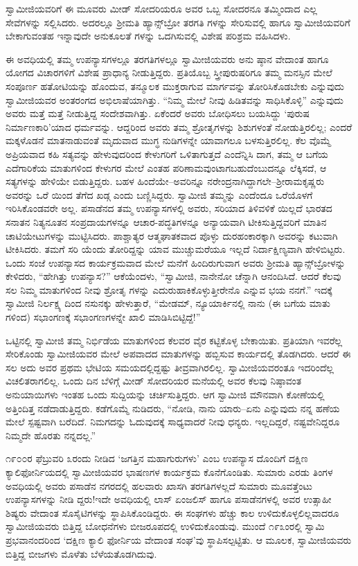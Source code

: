 ಸ್ವಾಮೀಜಿಯವರಿಗೆ ಈ ಮೂವರು ಮೀಡ್ ಸೋದರಿಯರೂ ಅವರ ಒಬ್ಬ ಸೋದರನೂ ತಮ್ಮಿಂದಾದ ಎಲ್ಲ ಸೇವೆಗಳನ್ನು ಸಲ್ಲಿಸಿದರು. ಅದರಲ್ಲೂ ಶ್ರೀಮತಿ ಹ್ಯಾನ್ಸ್​ಬ್ರೋ ತರಗತಿ ಗಳನ್ನು ಸೇರಿಸುವಲ್ಲಿ ಹಾಗೂ ಸ್ವಾಮೀಜಿಯವರಿಗೆ ಬೇಕಾಗುವಂತಹ ಇನ್ನಾವುದೇ ಅನುಕೂಲತೆ ಗಳನ್ನು ಒದಗಿಸುವಲ್ಲಿ ವಿಶೇಷ ಪರಿಶ್ರಮ ವಹಿಸಿದಳು.

ಈ ಅವಧಿಯಲ್ಲಿ ತಮ್ಮ ಉಪನ್ಯಾಸಗಳಲ್ಲೂ ತರಗತಿಗಳಲ್ಲೂ ಸ್ವಾಮೀಜಿಯವರು ಅನು ಷ್ಠಾನ ವೇದಾಂತ ಹಾಗೂ ಯೋಗದ ವಿಚಾರಗಳಿಗೆ ವಿಶೇಷ ಪ್ರಾಧಾನ್ಯ ನೀಡುತ್ತಿದ್ದರು. ಪ್ರತಿಯೊಬ್ಬ ಸ್ತ್ರೀಪುರುಷರಿಗೂ ತಮ್ಮ ಮನಸ್ಸಿನ ಮೇಲೆ ಸಂಪೂರ್ಣ ಹತೋಟಿಯನ್ನು ಹೊಂದುವ, ತನ್ಮೂಲಕ ಮುಕ್ತರಾಗುವ ಮಾರ್ಗವನ್ನು ತೋರಿಸಿಕೊಡಬೇಕು ಎನ್ನುವುದು ಸ್ವಾಮೀಜಿಯವರ ಅಂತರಂಗದ ಅಭಿಲಾಷೆಯಾಗಿತ್ತು. “ನಿಮ್ಮ ಮೇಲೆ ನೀವು ಹಿಡಿತವನ್ನು ಸಾಧಿಸಿಕೊಳ್ಳಿ” ಎನ್ನುವುದು ಅವರು ಮತ್ತೆ ಮತ್ತೆ ನೀಡುತ್ತಿದ್ದ ಸಂದೇಶವಾಗಿತ್ತು. ಏಕೆಂದರೆ ಅವರು ಬೋಧಿಸಲು ಬಯಸಿದ್ದು ‘ಪುರುಷ ನಿರ್ಮಾಣಕಾರಿ’ಯಾದ ಧರ್ಮವನ್ನು. ಆದ್ದರಿಂದ ಅವರು ತಮ್ಮ ಶ್ರೋತೃಗಳನ್ನು ಶಿಶುಗಳಂತೆ ನೋಡುತ್ತಿರಲಿಲ್ಲ; ಎಂದರೆ ಮಕ್ಕಳೊಡನೆ ಮಾತನಾಡುವಂತೆ ಮೃದುವಾದ ಮುಗ್ಧ ನುಡಿಗಳನ್ನೇ ಯಾವಾಗಲೂ ಬಳಸುತ್ತಿರಲಿಲ್ಲ. ಕೆಲ ವೊಮ್ಮೆ ಅಪ್ರಿಯವಾದ ಕಹಿ ಸತ್ಯವನ್ನು ಹೇಳುವುದರಿಂದ ಕೇಳುಗರಿಗೆ ಒಳಿತಾಗುತ್ತದೆ ಎಂದೆನ್ನಿಸಿ ದಾಗ, ತಮ್ಮ ಆ ಬಗೆಯ ಎದೆಗಾರಿಕೆಯ ಮಾತುಗಳಿಂದ ಕೇಳುಗರ ಮೇಲೆ ಎಂತಹ ಪರಿಣಾಮವುಂಟಾಗಬಹುದೆಂಬುದನ್ನೂ ಲೆಕ್ಕಿಸದೆ, ಆ ಸತ್ಯಗಳನ್ನು ಹೇಳಿಯೇ ಬಿಡುತ್ತಿದ್ದರು. ಬಹಳ ಹಿಂದೆಯೇ–ಅವರಿನ್ನೂ ನರೇಂದ್ರನಾಗಿದ್ದಾಗಲೇ–ಶ್ರೀರಾಮಕೃಷ್ಣರು ಅವರನ್ನು ಒರೆ ಯಿಂದ ತೆಗೆದ ಖಡ್ಗ ಎಂದು ಬಣ್ಣಿಸಿದ್ದರು. ಸ್ವಾಮೀಜಿ ತಮ್ಮನ್ನು ಎಂದೆಂದೂ ಒರೆಯೊಳಗೆ ಇರಿಸಿಕೊಂಡವರೇ ಅಲ್ಲ. ಪಸಾಡೆನದ ತಮ್ಮ ಉಪನ್ಯಾಸಗಳಲ್ಲಿ ಅವರು, ಸರಿಯಾದ ತಿಳಿವಳಿಕೆ ಯಿಲ್ಲದೆ ಭಾರತದ ಸನಾತನ ನಿತ್ಯನೂತನ ಸಂಪ್ರದಾಯಗಳನ್ನೂ ಆಚಾರ-ಪದ್ಧತಿಗಳನ್ನೂ ಅನ್ಯಾಯವಾಗಿ ಟೀಕಿಸುತ್ತಿದ್ದವರಿಗೆ ಮಾತಿನ ಚಾಟಿಯೇಟುಗಳನ್ನು ಮುಟ್ಟಿಸಿದರು. ಪಾಶ್ಚಾತ್ಯರ ಆತ್ಮಘಾತಕವಾದ ಪೊಳ್ಳು ದುರಹಂಕಾರಕ್ಕಾಗಿ ಅವರನ್ನು ಕಟುವಾಗಿ ಟೀಕಿಸಿದರು. ತಮಗೆ ಸರಿ ಯೆಂದು ತೋರಿದ್ದನ್ನು ಯಾವ ಮುಚ್ಚುಮರೆಯೂ ಇಲ್ಲದೆ ನಿರ್ದಾಕ್ಷಿಣ್ಯವಾಗಿ ಹೇಳಿಬಿಟ್ಟರು. ಒಂದು ಸಂಜೆ ಉಪನ್ಯಾಸದ ಕಾರ್ಯಕ್ರಮವಾದ ಮೇಲೆ ಮನೆಗೆ ಹಿಂದಿರುಗುವಾಗ ಅವರು ಶ್ರೀಮತಿ ಹ್ಯಾನ್ಸ್​ಬ್ರೋಳನ್ನು ಕೇಳಿದರು, “ಹೇಗಿತ್ತು ಉಪನ್ಯಾಸ?” ಆಕೆಯೆಂದಳು, “ಸ್ವಾಮೀಜಿ, ನಾನೇನೋ ಚೆನ್ನಾಗಿ ಆನಂದಿಸಿದೆ. ಆದರೆ ಕೆಲವು ಸಲ ನಿಮ್ಮ ಮಾತುಗಳಿಂದ ನೀವು ಶ್ರೋತೃ ಗಳನ್ನು ಎದುರುಹಾಕಿಕೊಳ್ಳುತ್ತೀರೇನೊ ಎನ್ನುವ ಭಯ ನನಗೆ.” ಇದಕ್ಕೆ ಸ್ವಾಮೀಜಿ ನಿರ್ಲಕ್ಷ್ಯ ದಿಂದ ನಸುನಕ್ಕು ಹೇಳುತ್ತಾರೆ, “ಮೇಡಮ್, ನ್ಯೂಯಾರ್ಕಿನಲ್ಲಿ ನಾನು (ಈ ಬಗೆಯ ಮಾತು ಗಳಿಂದ) ಸಭಾಂಗಣಕ್ಕೆ ಸಭಾಂಗಣಗಳನ್ನೇ ಖಾಲಿ ಮಾಡಿಸಿಬಿಟ್ಟಿದ್ದೆ!”

ಒಟ್ಟಿನಲ್ಲಿ ಸ್ವಾಮೀಜಿ ತಮ್ಮ ನಿರ್ಭಿಡೆಯ ಮಾತುಗಳಿಂದ ಕೆಲವರ ವೈರ ಕಟ್ಟಿಕೊಳ್ಳ ಬೇಕಾಯಿತು. ಪ್ರತಿಯಾಗಿ ಇವರೆಲ್ಲ ಸೇರಿಕೊಂಡು ಸ್ವಾಮೀಜಿಯವರ ಮೇಲೆ ಅಪವಾದದ ಮಾತುಗಳನ್ನು ಹಬ್ಬಿಸುವ ಕಾರ್ಯದಲ್ಲಿ ತೊಡಗಿದರು. ಆದರೆ ಈ ಸಲ ಅದು ಅವರ ಪ್ರಥಮ ಭೇಟಿಯ ಸಮಯದಲ್ಲಿದ್ದಷ್ಟು ತೀವ್ರವಾಗಿರಲಿಲ್ಲ. ಸ್ವಾಮೀಜಿಯವರಂತೂ ಇದರಿಂದೆಲ್ಲ ವಿಚಲಿತರಾಗಲಿಲ್ಲ. ಒಂದು ದಿನ ಬೆಳಿಗ್ಗೆ ಮೀಡ್ ಸೋದರಿಯರ ಮನೆಯಲ್ಲಿ ಅವರ ಕೆಲವು ನಿಷ್ಠಾವಂತ ಅನುಯಾಯಿಗಳು ಇಂತಹ ಒಂದು ಸುದ್ದಿಯನ್ನು ಚರ್ಚಿಸುತ್ತಿದ್ದರು. ಆಗ ಸ್ವಾಮೀಜಿ ಮೌನವಾಗಿ ಕೋಣೆಯಲ್ಲಿ ಅತ್ತಿಂದಿತ್ತ ನಡೆದಾಡುತ್ತಿದ್ದರು. ಕಡೆಗೊಮ್ಮೆ ನುಡಿದರು, “ನೋಡಿ, ನಾನು ಯಾರು–ಏನು ಎನ್ನುವುದು ನನ್ನ ಹಣೆಯ ಮೇಲೆ ಸ್ಪಷ್ಟವಾಗಿ ಬರೆದಿದೆ. ನಿಮಗದನ್ನು ಓದುವುದಕ್ಕೆ ಸಾಧ್ಯವಾದರೆ ನೀವು ಧನ್ಯರು. ಇಲ್ಲದಿದ್ದರೆ, ನಷ್ಟವೇನಿದ್ದರೂ ನಿಮ್ಮದೇ ಹೊರತು ನನ್ನದಲ್ಲ.”

೧೯೦೦ರ ಫೆಬ್ರುವರಿ ೩ರಂದು ನೀಡಿದ ‘ಜಗತ್ತಿನ ಮಹಾಗುರುಗಳು’ ಎಂಬ ಉಪನ್ಯಾಸ ದೊಂದಿಗೆ ದಕ್ಷಿಣ ಕ್ಯಾಲಿಫೋರ್ನಿಯದಲ್ಲಿ ಸ್ವಾಮೀಜಿಯವರ ಭಾಷಣಗಳ ಕಾರ್ಯಕ್ರಮ ಕೊನೆಗೊಂಡಿತು. ಸುಮಾರು ಎರಡು ತಿಂಗಳ ಅವಧಿಯಲ್ಲಿ ಅವರು ಪಸಾಡೆನ ನಗರದಲ್ಲಿ ಹಲವಾರು ಖಾಸಗಿ ತರಗತಿಗಳಲ್ಲದೆ ಸುಮಾರು ಮೂವತ್ತೆಂಟು ಉಪನ್ಯಾಸಗಳನ್ನು ನೀಡಿ ದ್ದರು!ಇದೇ ಅವಧಿಯಲ್ಲಿ ಲಾಸ್ ಏಂಜಲಿಸ್ ಹಾಗೂ ಪಸಾಡೆನಗಳಲ್ಲಿ ಅವರ ಉತ್ಸಾಹೀ ಶಿಷ್ಯರು ವೇದಾಂತ ಸೊಸೈಟಿಗಳನ್ನು ಸ್ಥಾಪಿಸಿಕೊಂಡಿದ್ದರು. ಈ ಸಂಘಗಳು ಹೆಚ್ಚು ಕಾಲ ಉಳಿದುಕೊಳ್ಳಲಿಲ್ಲವಾದರೂ ಸ್ವಾಮೀಜಿಯವರು ಬಿತ್ತಿದ್ದ ಬೋಧನೆಗಳು ಬೀಜರೂಪದಲ್ಲಿ ಉಳಿದುಕೊಂಡುವು. ಮುಂದೆ ೧೯೩ಂರಲ್ಲಿ ಸ್ವಾಮಿ ಪ್ರಭವಾನಂದರಿಂದ ‘ದಕ್ಷಿಣ ಕ್ಯಾಲಿ ಫೋರ್ನಿಯ ವೇದಾಂತ ಸಂಘ’ವು ಸ್ಥಾಪಿಸಲ್ಪಟ್ಟಿತು. ಆ ಮೂಲಕ, ಸ್ವಾಮೀಜಿಯವರು ಬಿತ್ತಿದ್ದ ಬೀಜಗಳು ಮೊಳೆತು ಬೆಳೆಯತೊಡಗಿದುವು.

